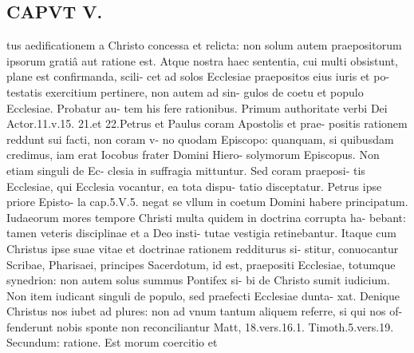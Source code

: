 \documentclass{article}
\begin{document}
\begin{pages}
\section*{CAPVT  V. }
\marginpar{[ p.245 ]}\pstart tus aedificationem a Christo concessa et relicta: non solum autem praepositorum ipsorum gratiâ aut ratione est. Atque nostra haec sententia, cui multi obsistunt, plane est confirmanda, scili- cet ad solos Ecclesiae praepositos eius iuris et po- testatis exercitium pertinere, non autem ad sin- gulos de coetu et populo Ecclesiae. Probatur au- tem his fere rationibus. Primum authoritate verbi Dei Actor.11.v.15. 21.et 22.Petrus et Paulus coram Apostolis et prae- positis rationem reddunt sui facti, non coram v- no quodam Episcopo: quanquam, si quibusdam credimus, iam erat Iocobus frater Domini Hiero- solymorum Episcopus. Non etiam singuli de Ec- clesia in suffragia mittuntur. Sed coram praeposi- tis Ecclesiae, qui Ecclesia vocantur, ea tota dispu- tatio disceptatur. Petrus ipse priore Episto- la cap.5.V.5. negat se vllum in coetum Domini habere principatum. Iudaeorum mores tempore Christi multa quidem in doctrina corrupta ha- bebant: tamen veteris disciplinae et a Deo insti- tutae vestigia retinebantur. Itaque cum Christus ipse suae vitae et doctrinae rationem redditurus si- stitur, conuocantur Scribae, Pharisaei, principes Sacerdotum, id est, praepositi Ecclesiae, totumque synedrion: non autem solus summus Pontifex si- bi de Christo sumit iudicium. Non item iudicant singuli de populo, sed praefecti Ecclesiae dunta- xat. Denique Christus nos iubet ad plures: non ad vnum tantum aliquem referre, si qui nos of- fenderunt nobis sponte non reconciliantur Matt, 18.vers.16.1. Timoth.5.vers.19. Secundum: ratione. Est morum coercitio et  \pend

\end{pages}
\end{document}
